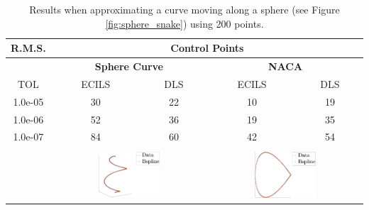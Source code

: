  \begin{table}
 \centering
  \begin{tabular}{||c||c c || c c ||}
  \hline
 R.M.S.  &\multicolumn{4}{c||}{Control Points}\\
 \hline
  &\multicolumn{2}{c||}{\textbf{Sphere Curve}} & \multicolumn{2}{c||}{\textbf{NACA}}\\

 TOL& ECILS& DLS & ECILS & DLS\\
 \hline
1.0e-05 & 30 & 22 & 10 & 19 \\%
1.0e-06 & 52 & 36 & 19 & 35 \\%
1.0e-07 & 84 & 60 & 42 & 54 \\%

\hline
&\multicolumn{2}{c||}{}&\multicolumn{2}{c||}{}\\
&\multicolumn{2}{c||}{\includegraphics[width=0.42\textwidth]{snake-crop}}
&\multicolumn{2}{c||}{\includegraphics[width=0.42\textwidth]{naca27-crop} }\\
\hline
\end{tabular}
\caption{Results when approximating a curve moving along a sphere (see Figure \ref{fig:sphere_snake}) using 200 points.}
 \end{table}

 
 
